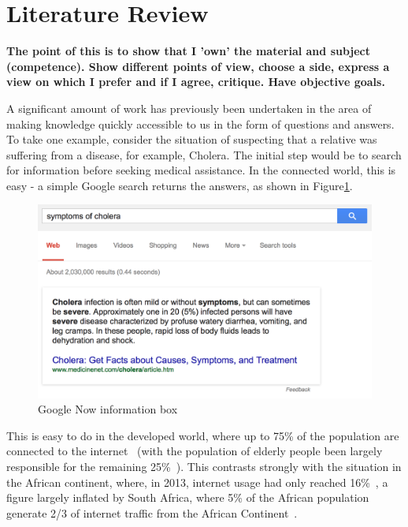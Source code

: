 \documentclass{article}
\begin{document}
\newpage

\section{Literature Review}
\label{sec:literatureReview}

{\bf The point of this is to show that I 'own' the material and subject (competence).  Show different points of view, choose a side, express a view on which I prefer and if I agree, critique.  Have objective goals.}

A significant amount of work has previously been undertaken in the area of making knowledge quickly accessible to us in the form of questions and answers.  To take one example, consider the situation of suspecting that a relative was suffering from a disease, for example, Cholera.  The initial step would be to search for information before seeking medical assistance.  In the connected world, this is easy - a simple Google search returns the answers, as shown in Figure\ref{fig:cholera}.

\begin{figure}[htb] 
\includegraphics[width=\linewidth]{googleCholera}
\caption{Google Now information box}
\label{fig:cholera}
\end{figure}


This is easy to do in the developed world, where up to 75\% of the population are connected to the internet~\cite{ITU_Cell_Usage_2013} (with the population of elderly people been largely responsible for the remaining 25\%~\cite{Gov_Internet_Usage_UK_2014}).  This contrasts strongly with the situation in the African continent, where, in 2013, internet usage had only reached 16\%~\cite{ITU_Cell_Usage_2013}, a figure largely inflated by South Africa, where 5\% of the African population generate 2/3 of internet traffic from the African Continent~\cite{ITU_Cell_Usage_2013}.
\end{document}
